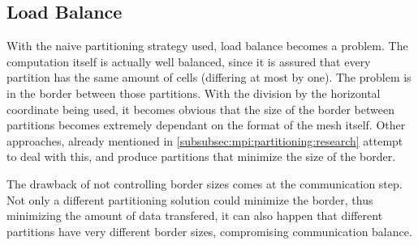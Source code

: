 \subsection{Load Balance}
\label{subsec:mpi:load}


With the naive partitioning strategy used, load balance becomes a problem.
The computation itself is actually well balanced, since it is assured that every partition has the same amount of cells (differing at most by one). The problem is in the border between those partitions.
With the division by the horizontal coordinate being used, it becomes obvious that the size of the border between partitions becomes extremely dependant on the format of the mesh itself.
Other approaches, already mentioned in \cref{subsubsec:mpi:partitioning:research} attempt to deal with this, and produce partitions that minimize the size of the border.

The drawback of not controlling border sizes comes at the communication step.
Not only a different partitioning solution could minimize the border, thus minimizing the amount of data transfered, it can also happen that different partitions have very different border sizes, compromising communication balance.

